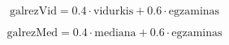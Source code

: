 \documentclass{article}
\begin{document}
\[
  \text{galrezVid} = 0.4 \cdot \text{vidurkis} + 0.6 \cdot \text{egzaminas}
\]
\pagebreak

\[
  \text{galrezMed} = 0.4 \cdot \text{mediana} + 0.6 \cdot \text{egzaminas}
\]
\pagebreak
\end{document}
